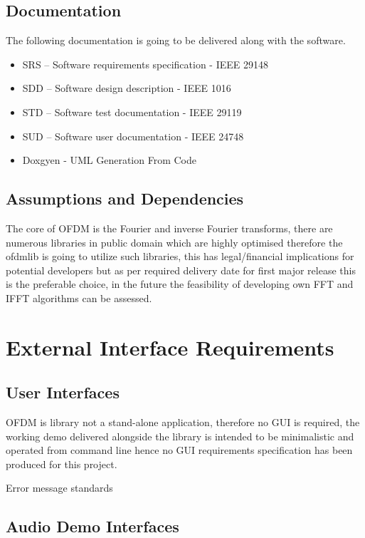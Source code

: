 \documentclass[]{report}
\begin{document}
\subsection{Documentation}

The following documentation is going to be delivered along with the software.

\begin{itemize}
	\item SRS – Software requirements specification - IEEE 29148
	\item SDD – Software design description - IEEE 1016
	\item STD – Software test documentation - IEEE 29119
	\item SUD – Software user documentation - IEEE 24748
	\item Doxgyen - UML Generation From Code 
\end{itemize}


\subsection{Assumptions and Dependencies}

The core of OFDM is the Fourier and inverse Fourier transforms, there are numerous libraries in public domain which are highly optimised therefore the ofdmlib is going to utilize such libraries, this has legal/financial implications for potential developers but as per required delivery date for first major release this is the preferable choice, in the future the feasibility of developing own FFT and IFFT algorithms can be assessed.

\pagebreak
\section{External Interface Requirements}

\subsection{User Interfaces}

OFDM is library not a stand-alone application, therefore no GUI is required, the working demo delivered alongside the library is intended to be minimalistic and operated from command line hence no GUI requirements specification has been produced for this project. 

Error message standards

\subsection{Audio Demo Interfaces}
\end{document}
